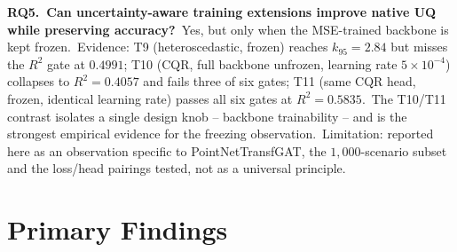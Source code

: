 \textbf{RQ5.\ Can uncertainty-aware training extensions improve native UQ while preserving accuracy?}\ Yes, but only when the MSE-trained backbone is kept frozen.\ Evidence: T9 (heteroscedastic, frozen) reaches $k_{95} = 2.84$ but misses the $R^2$ gate at $0.4991$; T10 (CQR, full backbone unfrozen, learning rate $5\times10^{-4}$) collapses to $R^2 = 0.4057$ and fails three of six gates; T11 (same CQR head, frozen, identical learning rate) passes all six gates at $R^2 = 0.5835$.\ The T10/T11 contrast isolates a single design knob -- backbone trainability -- and is the strongest empirical evidence for the freezing observation.\ Limitation: reported here as an observation specific to PointNetTransfGAT, the $1{,}000$-scenario subset and the loss/head pairings tested, not as a universal principle.

\section{Primary Findings}\label{sec:primary_results}

